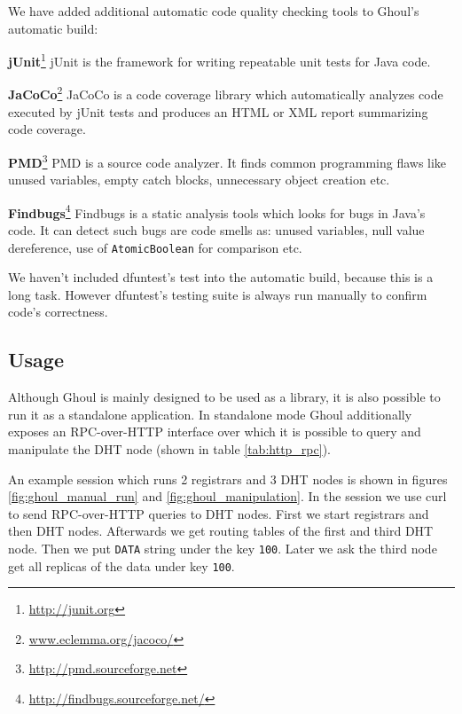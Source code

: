 We have added additional automatic code quality checking tools to Ghoul's automatic build:

\begin{description}
  \item{\textbf{jUnit}\footnote{\url{http://junit.org}}} 
    jUnit is the framework for writing repeatable unit tests for Java code.
  \item{\textbf{JaCoCo}\footnote{\url{www.eclemma.org/jacoco/}}}
    JaCoCo is a code coverage library which automatically analyzes code executed by jUnit tests and produces an HTML or XML report summarizing code coverage.

  \item{\textbf{PMD}\footnote{\url{http://pmd.sourceforge.net}}}
    PMD is a source code analyzer.
    It finds common programming flaws like unused variables, empty catch blocks, unnecessary object creation etc.
  \item{\textbf{Findbugs}\footnote{\url{http://findbugs.sourceforge.net/}}}
    Findbugs is a static analysis tools which looks for bugs in Java's code.
    It can detect such bugs are code smells as: unused variables, null value dereference, use of \texttt{AtomicBoolean} for comparison etc.
    
\end{description}

We haven't included dfuntest's test into the automatic build, because this is a long task.
However dfuntest's testing suite is always run manually to confirm code's correctness.

\subsection{Usage}

Although Ghoul is mainly designed to be used as a library, it is also possible to run it as a standalone application.
In standalone mode Ghoul additionally exposes an RPC-over-HTTP interface over which it is possible to query and manipulate the DHT node (shown in table \ref{tab:http_rpc}).

An example session which runs 2 registrars and 3 DHT nodes is shown in figures 
\ref{fig:ghoul_manual_run} and \ref{fig:ghoul_manipulation}.
In the session we use curl to send RPC-over-HTTP queries to DHT nodes.
First we start registrars and then DHT nodes.
Afterwards we get routing tables of the first and third DHT node.
Then we put \texttt{DATA} string under the key \texttt{100}.
Later we ask the third node get all replicas of the data under key \texttt{100}.

